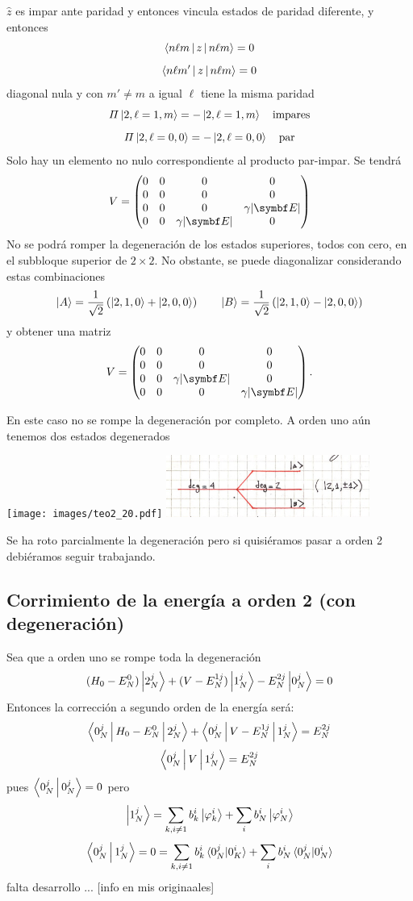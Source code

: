 \documentclass[10pt,oneside]{CBFT_book}
\begin{document}
$\hat{z}$ es impar ante paridad y entonces vincula estados de paridad diferente,
y entonces 
\[
	\Braket{n\ell m|z|n\ell m} = 0 
\]
\[
	\Braket{n\ell m'|z|n\ell m} = 0 
\]
diagonal nula y con $m'\neq m$ a igual $\ell$ tiene la misma paridad
\[
	\Pi \Ket{2,\ell=1,m} = -\Ket{2,\ell=1,m} \quad \text{impares}
\]
\[
	\Pi \Ket{2,\ell=0,0} = -\Ket{2,\ell=0,0} \quad \text{par}
\]
Solo hay un elemento no nulo correspondiente al producto par-impar.
Se tendrá 
\[
	V = \begin{pmatrix}
	   0 & 0 & 0 & 0 \\
	   0 & 0 & 0 & 0 \\
	   0 & 0 & 0 & \gamma|\vb{E}| \\
	   0 & 0 & \gamma|\vb{E}| & 0
	  \end{pmatrix}
\]
No se podrá romper la degeneración de los estados superiores, todos con cero,
en el subbloque superior de $2\times 2$.
No obstante, se puede diagonalizar considerando estas combinaciones
\[
	\Ket{A} = \frac{1}{\sqrt{2}} \left( \Ket{2,1,0} + \Ket{2,0,0} \right)
	\qquad
	\Ket{B} = \frac{1}{\sqrt{2}} \left( \Ket{2,1,0} - \Ket{2,0,0} \right)
\]
y obtener una matriz
\[
	V = \begin{pmatrix}
	   0 & 0 & 0 & 0 \\
	   0 & 0 & 0 & 0 \\
	   0 & 0 & \gamma|\vb{E}| & 0 \\	   
	   0 & 0 & 0 & \gamma|\vb{E}| 
	  \end{pmatrix}.
\]

En este caso no se rompe la degeneración por completo.
A orden uno aún tenemos dos estados degenerados

	\texttt{[image: images/teo2\_20.pdf]}
	\includegraphics[width=0.5\textwidth]{images/fig_ft2_degeneracion_3.jpg}

Se ha roto parcialmente la degeneración pero si quisiéramos pasar a orden 2 debiéramos
seguir trabajando.

\subsection{Corrimiento de la energía a orden 2 (con degeneración)}

Sea que a orden uno se rompe toda la degeneración 
\[
	(H_0 - E_N^0) \Ket{2_N^j} + (V - E_N^{1 j}) \Ket{1_N^j} - E_N^{2 j} \Ket{0_N^j} = 0
\]
Entonces la corrección a segundo orden de la energía será:
\[
	\Braket{0_N^j | H_0 - E_N^0 | 2_N^j} + \Braket{ 0_N^j | V - E_N^{1 j} | 1_N^j} = E_N^{2 j}
\]
\[
	\Braket{ 0_N^j | V | 1_N^j} = E_N^{2 j}
\]
pues $\Braket{0_N^j|0_N^j}= 0$ pero 
\[
	\Ket{1_N^j} = \sum_{k,i\neq 1} b_k^i \Ket{\varphi_k^i} + \sum_i b_N^i \Ket{\varphi_N^i}
\]
\[
	\Braket{0_N^j|1_N^j} = 0 = \sum_{k,i\neq 1} b_k^i \braket{0_N^j|0_K^i} + 
		\sum_i b_N^i \braket{0_N^j|0_N^i}
\]
falta desarrollo ... [info en mis originaales]
\end{document}
